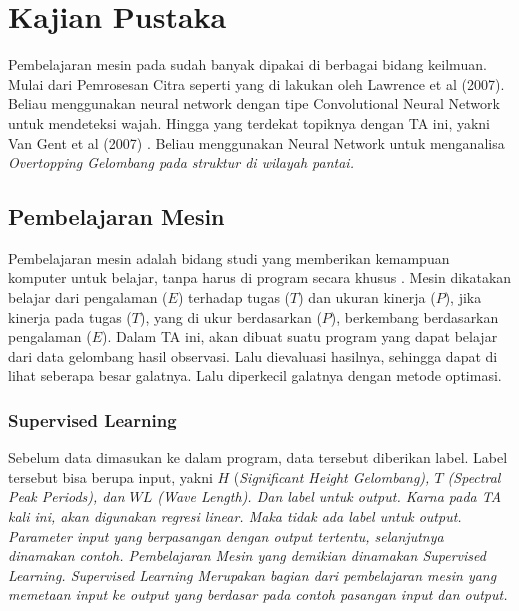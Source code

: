 \chapter{Kajian Pustaka}

Pembelajaran mesin pada sudah banyak dipakai di berbagai bidang keilmuan. Mulai dari Pemrosesan Citra seperti yang di lakukan oleh Lawrence et al (2007)\cite{lawrence1997face}. Beliau menggunakan neural network dengan tipe Convolutional Neural Network untuk mendeteksi wajah. Hingga yang terdekat topiknya dengan TA ini, yakni Van Gent et al (2007) \cite{van2007neural}. Beliau menggunakan Neural Network untuk menganalisa \em{Overtopping} Gelombang pada struktur di wilayah pantai.

\section{Pembelajaran Mesin}
    Pembelajaran mesin adalah bidang studi yang memberikan kemampuan komputer untuk belajar, tanpa harus di program secara khusus \cite{arthur_l_samuel_1959}. Mesin dikatakan belajar dari pengalaman ($E$) terhadap tugas ($T$) dan ukuran kinerja ($P$), jika kinerja pada tugas ($T$), yang di ukur berdasarkan ($P$), berkembang berdasarkan pengalaman ($E$). Dalam TA ini, akan dibuat suatu program yang dapat belajar dari data gelombang hasil observasi. Lalu dievaluasi hasilnya, sehingga dapat di lihat seberapa besar galatnya. Lalu diperkecil galatnya dengan metode optimasi.

\subsection{Supervised Learning}
    Sebelum data dimasukan ke dalam program, data tersebut diberikan label. Label tersebut bisa berupa input, yakni $H$ (\em{Significant Height} Gelombang), $T$ (\em{Spectral Peak Periods}), dan $WL$ (\em{Wave Length}). Dan label untuk output. Karna pada TA kali ini, akan digunakan regresi linear. Maka tidak ada label untuk output. Parameter input yang berpasangan dengan output tertentu, selanjutnya dinamakan contoh. Pembelajaran Mesin yang demikian dinamakan Supervised Learning. Supervised Learning Merupakan bagian dari pembelajaran mesin yang memetaan input ke output yang berdasar pada contoh pasangan input dan output\cite{AIPeterNorvig}. 

